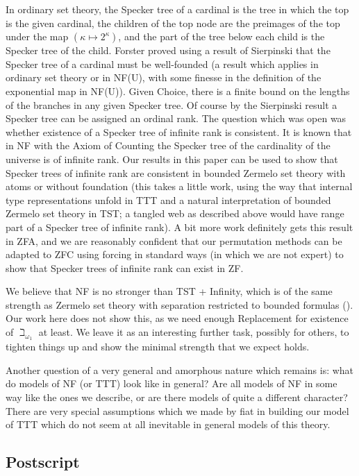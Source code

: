 \documentclass[112pt]{article}
\theoremstyle{definition}
\theoremstyle{remark}
\begin{document}
In ordinary set theory, the Specker tree of a cardinal is the tree in which the top is the given cardinal, the children of the top node  are the preimages of the top under the map $(\kappa \mapsto 2^{\kappa})$, and the part of the tree
below each child is the Specker tree of the child.  Forster proved using a result of Sierpinski that the Specker tree of a cardinal must be well-founded (a result which applies in ordinary set theory or in NF(U), with some finesse in the definition of the exponential map in NF(U)).  Given Choice, there is a finite bound on the lengths of the branches in any given Specker tree.  Of course by the Sierpinski result a Specker tree can be assigned an ordinal rank.  The question which was open
was whether existence of a Specker tree of infinite rank is consistent.  It is known that in NF with the Axiom of Counting the Specker tree of the cardinality of the universe is of infinite rank.  Our results in this paper can be used to show that Specker trees of infinite rank are consistent in bounded Zermelo set theory with atoms or without foundation (this takes a little work, using the way that internal type representations unfold in TTT and a natural interpretation of bounded Zermelo set theory in TST;  a tangled web as described above would have range part of a Specker tree of infinite rank).  A bit more work definitely gets this result in ZFA, and we are reasonably confident that our permutation methods can be adapted to ZFC using forcing in standard ways (in which we are not expert) to show that Specker trees of infinite rank can exist in ZF.

We believe that NF is no stronger than TST + Infinity, which is of the same strength as Zermelo set theory with separation restricted to bounded formulas (\cite{kemeny}).  Our work here does not show this, as we need enough Replacement for
existence of $\beth_{\omega_1}$ at least.  We leave it as an interesting further task, possibly for others, to tighten things up and show the minimal strength that we expect holds.

Another question of a very general and amorphous nature which remains is:  what do models of NF (or TTT) look like in general?  Are all models of NF in some way like the ones we describe, or are there models of quite a different character?  There are very special assumptions which we made by fiat in building our model of TTT which do  not seem at all inevitable in general models of this theory.

\subsection{Postscript}
\end{document}
